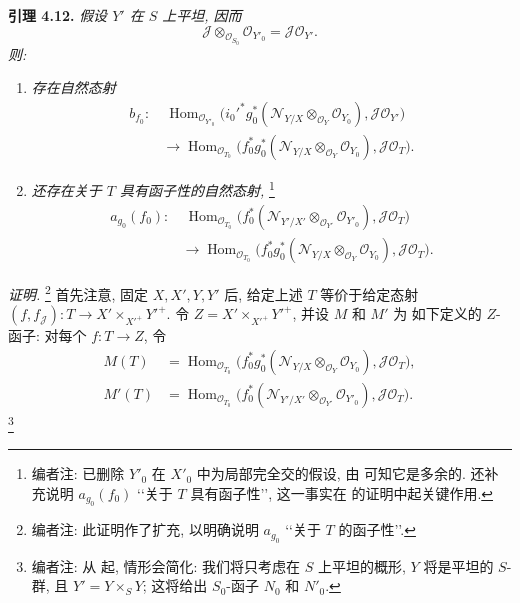 \medskip
\noindent{}\textbf{引理 4.12.}
\textit{假设 \(Y'\) 在 \(S\) 上平坦, 因而
\[
 \mathscr J\otimes_{\mathscr O_{S_0}}\mathscr O_{Y'_0}
 =\mathscr J\mathscr O_{Y'}.
\]
则:}
\begin{enumerate}
\item[(i)] \textit{存在自然态射}
\begin{align*}
 b_{f_0}:&\
 \operatorname{Hom}_{\mathscr O_{Y'_0}}
 \bigl(i_0'^*g_0^*(\mathscr N_{Y/X}
   \otimes_{\mathscr O_Y}\mathscr O_{Y_0}),
   \mathscr J\mathscr O_{Y'}\bigr)\\
 &\longrightarrow
 \operatorname{Hom}_{\mathscr O_{T_0}}
 \bigl(f_0^*g_0^*(\mathscr N_{Y/X}
   \otimes_{\mathscr O_Y}\mathscr O_{Y_0}),
   \mathscr J\mathscr O_T\bigr).
\end{align*}
\item[(ii)] \textit{还存在关于 \(T\) 具有函子性的自然态射,}
\footnote{编者注: 已删除 \(Y'_0\) 在 \(X'_0\) 中为局部完全交的假设,
由 可知它是多余的.
还补充说明 \(a_{g_0}(f_0)\) \lq\lq 关于 \(T\) 具有函子性\rq\rq,
这一事实在 的证明中起关键作用.}
\begin{align*}
 a_{g_0}(f_0):&\
 \operatorname{Hom}_{\mathscr O_{T_0}}
 \bigl(f_0^*(\mathscr N_{Y'/X'}
   \otimes_{\mathscr O_{Y'}}\mathscr O_{Y'_0}),
   \mathscr J\mathscr O_T\bigr)\\
 &\longrightarrow
 \operatorname{Hom}_{\mathscr O_{T_0}}
 \bigl(f_0^*g_0^*(\mathscr N_{Y/X}
   \otimes_{\mathscr O_Y}\mathscr O_{Y_0}),
   \mathscr J\mathscr O_T\bigr).
\end{align*}
\end{enumerate}

\noindent\textit{证明.}
\footnote{编者注: 此证明作了扩充, 以明确说明 \(a_{g_0}\)
\lq\lq 关于 \(T\) 的函子性\rq\rq.}
首先注意, 固定 \(X,X',Y,Y'\) 后, 给定上述 \(T\)
等价于给定态射 \((f,f_{\mathscr J}):T\to X'\times_{X'^{+}}Y'^{+}\).
令 \(Z=X'\times_{X'^{+}}Y'^{+}\), 并设 \(M\) 和 \(M'\) 为
如下定义的 \(Z\)-函子: 对每个 \(f:T\to Z\), 令
\begin{align*}
 M(T)&=
 \operatorname{Hom}_{\mathscr O_{T_0}}
 \bigl(f_0^*g_0^*(\mathscr N_{Y/X}
   \otimes_{\mathscr O_Y}\mathscr O_{Y_0}),
   \mathscr J\mathscr O_T\bigr),\\
 M'(T)&=
 \operatorname{Hom}_{\mathscr O_{T_0}}
 \bigl(f_0^*(\mathscr N_{Y'/X'}
   \otimes_{\mathscr O_{Y'}}\mathscr O_{Y'_0}),
   \mathscr J\mathscr O_T\bigr).
\end{align*}
\footnote{编者注: 从 起, 情形会简化:
我们将只考虑在 \(S\) 上平坦的概形, \(Y\) 将是平坦的
\(S\)-群, 且 \(Y'=Y\times_S Y\); 这将给出 \(S_0\)-函子
\(N_0\) 和 \(N'_0\).}

